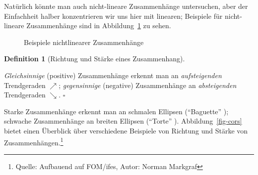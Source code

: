 \documentclass[
  letterpaper,
]{scrbook}
\theoremstyle{definition}
\theoremstyle{definition}
\newtheorem{definition}{Definition}[chapter]
\theoremstyle{definition}
\theoremstyle{remark}
\begin{document}
Natürlich könnte man auch nicht-lineare Zusammenhänge untersuchen, aber
der Einfachheit halber konzentrieren wir uns hier mit linearen;
Beispiele für nicht-lineare Zusammenhänge sind in
Abbildung~\ref{fig-nonlinear} zu sehen.

\begin{figure}


\caption{\label{fig-nonlinear}Beispiele nichtlinearer Zusammenhänge}

\end{figure}%

\begin{definition}[Richtung und Stärke eines
Zusammenhang]\protect\hypertarget{def-zshg}{}\label{def-zshg}

\emph{Gleichsinnige} (positive) Zusammenhänge erkennt man an
\emph{aufsteigenden} Trendgeraden \(\nearrow\); \emph{gegensinnige}
(negative) Zusammenhänge an \emph{absteigenden} Trendgeraden
\(\searrow\). \(\square\)

\end{definition}

Starke Zusammenhänge erkennt man an schmalen Ellipsen (``Baguette'' );
schwache Zusammenhänge an breiten Ellipsen (``Torte'' ).
Abbildung~\ref{fig-cors} bietet einen Überblick über verschiedene
Beispiele von Richtung und Stärke von Zusammenhängen.\footnote{Quelle:
  Aufbauend auf FOM/ifes, Autor: Norman Markgraf}
\end{document}
